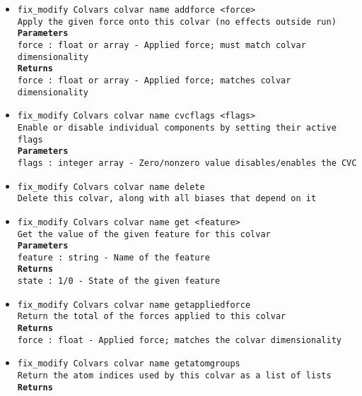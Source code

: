 \begin{itemize}
\item \texttt{fix\_modify Colvars colvar name addforce <force>}
\\
\texttt{Apply the given force onto this colvar (no effects outside run)}
\\
\texttt{\textbf{Parameters}}
\\
\texttt{force : float or array - Applied force; must match colvar dimensionality}
\\
\texttt{\textbf{Returns}}
\\
\texttt{force : float or array - Applied force; matches colvar dimensionality}
\item \texttt{fix\_modify Colvars colvar name cvcflags <flags>}
\\
\texttt{Enable or disable individual components by setting their active flags}
\\
\texttt{\textbf{Parameters}}
\\
\texttt{flags : integer array - Zero/nonzero value disables/enables the CVC}
\item \texttt{fix\_modify Colvars colvar name delete}
\\
\texttt{Delete this colvar, along with all biases that depend on it}
\item \texttt{fix\_modify Colvars colvar name get <feature>}
\\
\texttt{Get the value of the given feature for this colvar}
\\
\texttt{\textbf{Parameters}}
\\
\texttt{feature : string - Name of the feature}
\\
\texttt{\textbf{Returns}}
\\
\texttt{state : 1/0 - State of the given feature}
\item \texttt{fix\_modify Colvars colvar name getappliedforce}
\\
\texttt{Return the total of the forces applied to this colvar}
\\
\texttt{\textbf{Returns}}
\\
\texttt{force : float - Applied force; matches the colvar dimensionality}
\item \texttt{fix\_modify Colvars colvar name getatomgroups}
\\
\texttt{Return the atom indices used by this colvar as a list of lists}
\\
\texttt{\textbf{Returns}}
\\

\end{itemize}

